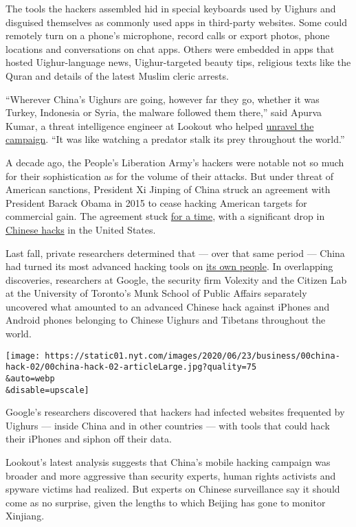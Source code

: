 The tools the hackers assembled hid in special keyboards used by Uighurs
and disguised themselves as commonly used apps in third-party websites.
Some could remotely turn on a phone's microphone, record calls or export
photos, phone locations and conversations on chat apps. Others were
embedded in apps that hosted Uighur-language news, Uighur-targeted
beauty tips, religious texts like the Quran and details of the latest
Muslim cleric arrests.

``Wherever China's Uighurs are going, however far they go, whether it
was Turkey, Indonesia or Syria, the malware followed them there,'' said
Apurva Kumar, a threat intelligence engineer at Lookout who helped
\href{https://blog.lookout.com/multiyear-surveillance-campaigns-discovered-targeting-uyghurs}{unravel
the campaign}. ``It was like watching a predator stalk its prey
throughout the world.''

A decade ago, the People's Liberation Army's hackers were notable not so
much for their sophistication as for the volume of their attacks. But
under threat of American sanctions, President Xi Jinping of China struck
an agreement with President Barack Obama in 2015 to cease hacking
American targets for commercial gain. The agreement stuck
\href{https://www.nytimes.com/2016/06/21/us/politics/china-us-cyber-spying.html}{for
a time}, with a significant drop in
\href{https://www.nytimes.com/2016/06/21/us/politics/china-us-cyber-spying.html}{Chinese
hacks} in the United States.

Last fall, private researchers determined that --- over that same period
--- China had turned its most advanced hacking tools on
\href{https://www.nytimes.com/2019/10/22/technology/china-hackers-ethnic-minorities.html}{its
own people}. In overlapping discoveries, researchers at Google, the
security firm Volexity and the Citizen Lab at the University of
Toronto's Munk School of Public Affairs separately uncovered what
amounted to an advanced Chinese hack against iPhones and Android phones
belonging to Chinese Uighurs and Tibetans throughout the world.

\texttt{[image: https://static01.nyt.com/images/2020/06/23/business/00china-hack-02/00china-hack-02-articleLarge.jpg?quality=75\\\&auto=webp\\\&disable=upscale]}

Google's researchers discovered that hackers had infected websites
frequented by Uighurs --- inside China and in other countries --- with
tools that could hack their iPhones and siphon off their data.

Lookout's latest analysis suggests that China's mobile hacking campaign
was broader and more aggressive than security experts, human rights
activists and spyware victims had realized. But experts on Chinese
surveillance say it should come as no surprise, given the lengths to
which Beijing has gone to monitor Xinjiang.

